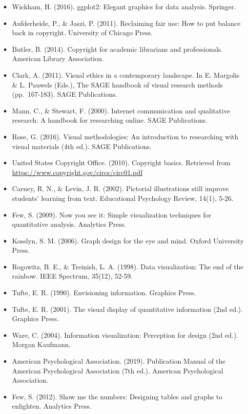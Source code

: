 \documentclass[
  b5paper]{book}
\providecommand{\tightlist}{%
  \setlength{\itemsep}{0pt}\setlength{\parskip}{0pt}}
\begin{document}
\begin{itemize}
\tightlist
\item
  Wickham, H. (2016). ggplot2: Elegant graphics for data analysis. Springer.
\item
  Aufderheide, P., \& Jaszi, P. (2011). Reclaiming fair use: How to put balance back in copyright. University of Chicago Press.
\item
  Butler, B. (2014). Copyright for academic librarians and professionals. American Library Association.
\item
  Clark, A. (2011). Visual ethics in a contemporary landscape. In E. Margolis \& L. Pauwels (Eds.), The SAGE handbook of visual research methods (pp.~167-183). SAGE Publications.
\item
  Mann, C., \& Stewart, F. (2000). Internet communication and qualitative research: A handbook for researching online. SAGE Publications.
\item
  Rose, G. (2016). Visual methodologies: An introduction to researching with visual materials (4th ed.). SAGE Publications.
\item
  United States Copyright Office. (2010). Copyright basics. Retrieved from \url{https://www.copyright.gov/circs/circ01.pdf}
\item
  Carney, R. N., \& Levin, J. R. (2002). Pictorial illustrations still improve students' learning from text. Educational Psychology Review, 14(1), 5-26.
\item
  Few, S. (2009). Now you see it: Simple visualization techniques for quantitative analysis. Analytics Press.
\item
  Kosslyn, S. M. (2006). Graph design for the eye and mind. Oxford University Press.
\item
  Rogowitz, B. E., \& Treinish, L. A. (1998). Data visualization: The end of the rainbow. IEEE Spectrum, 35(12), 52-59.
\item
  Tufte, E. R. (1990). Envisioning information. Graphics Press.
\item
  Tufte, E. R. (2001). The visual display of quantitative information (2nd ed.). Graphics Press.
\item
  Ware, C. (2004). Information visualization: Perception for design (2nd ed.). Morgan Kaufmann.
\item
  American Psychological Association. (2019). Publication Manual of the American Psychological Association (7th ed.). American Psychological Association.
\item
  Few, S. (2012). Show me the numbers: Designing tables and graphs to enlighten. Analytics Press.

\end{itemize}
\end{document}
